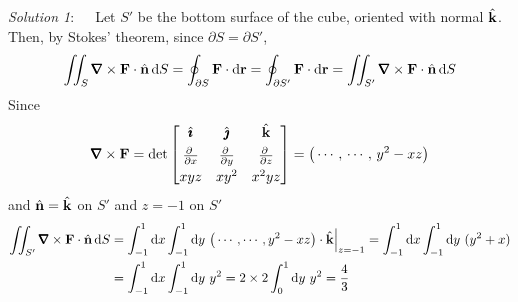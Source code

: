 \begin{solution} \emph{Solution 1}:\ \ \ 
Let $S'$ be the bottom surface of the cube, oriented with
normal $\hat{\mathbf{k}}$. Then, by Stokes' theorem, since $\partial S=\partial S'$,
\begin{equation*}
\dblInt_S\vnabla\times\vF\cdot\hn\, \dee{S}
=\oint_{\partial S}\vF\cdot \dee{\vr}
=\oint_{\partial S'}\vF\cdot \dee{\vr}
=\dblInt_{S'}\vnabla\times\vF\cdot\hn\, \dee{S}
\end{equation*}
Since 
\begin{align*}
\vnabla\times\vF=\det\left[\begin{matrix}\hi & \hj & \hk \\[0.05in]
                  \pdiff{}{x} &
                  \pdiff{}{y} &
                  \pdiff{}{z} \\[0.05in]
                  xyz & xy^2 & x^2yz \end{matrix}\right] 
=\big(\cdots\,,\,\cdots\,,\,y^2-xz\big)
\end{align*}
and $\hat{\mathbf{n}}=\hat{\mathbf{k}}$ on $S'$ and $z=-1$ on $S'$
\begin{align*}
\dblInt_{S'}\vnabla\times\vF\cdot\hn\, \dee{S}
&=\int_{-1}^1 \dee{x}\int_{-1}^1 \dee{y}\ 
         \big(\cdots,\cdots,y^2-xz\big)\cdot\hk\Big|_{z=-1}
=\int_{-1}^1 \dee{x}\int_{-1}^1 \dee{y}\  (y^2+x) \\
&=\int_{-1}^1 \dee{x}\int_{-1}^1 \dee{y}\  y^2
=2\times 2\int_0^1\dee{y}\ y^2
=\frac{4}{3}
\end{align*}



\end{solution}
